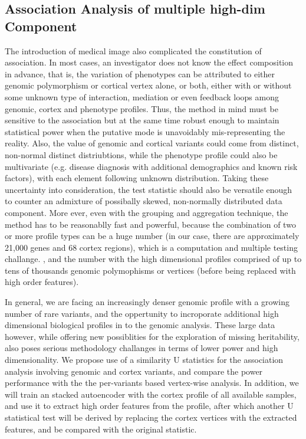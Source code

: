 \subsection{Association Analysis of multiple high-dim Component}
The introduction of medical image also complicated the constitution of association. In most cases, an investigator does not know the effect composition in advance, that is, the variation of phenotypes can be attributed to either genomic polymorphism or cortical vertex alone, or both, either with or without some unknown type of interaction, mediation or even feedback loops among genomic, cortex and phenotype profiles. Thus, the method in mind must be sensitive to the association but at the same time robust enough to maintain statistical power when the putative mode is unavoidably mis-representing the reality. Also, the value of genomic and cortical variants could come from distinct, non-normal distinct distriubtions, while the phenotype profile could also be multivariate (e.g. disease diagnosis with additional demographics and known risk factors), with each element following unknown distribution. Taking these uncertainty into consideration, the test statistic should also be versatile enough to counter an admixture of possibally skewed, non-normally distributed data component. More ever, even with the grouping and aggregation technique, the method has to be reasonablly fast and powerful, because the combination of two or more profile types can be a huge number (in our case, there are approximately 21,000 genes and 68 cortex regions), which is a computation and multiple testing challange. , and the number  with the high dimensional profiles comprised of up to tens of thousands genomic polymophisms or vertices (before being replaced with high order features).

In general, we are facing an increasingly denser genomic profile with a growing number of rare variants, and the oppertunity to incroporate additional high dimensional biological profiles in to the genomic analysis. These large data however, while offering new possiblities for the exploration of missing heritability, also poses serious methodology challanges in terms of lower power and high dimensionality. We propose use of a similarity U statistics for the association analysis involving genomic and cortex variants, and compare the power performance with the the per-variants based vertex-wise analysis. In addition, we will train an stacked autoencoder with the cortex profile of all available samples, and use it to extract high order features from the profile, after which another U statistical test will be derived by replacing the cortex vertices with the extracted features, and be compared with the original statistic.